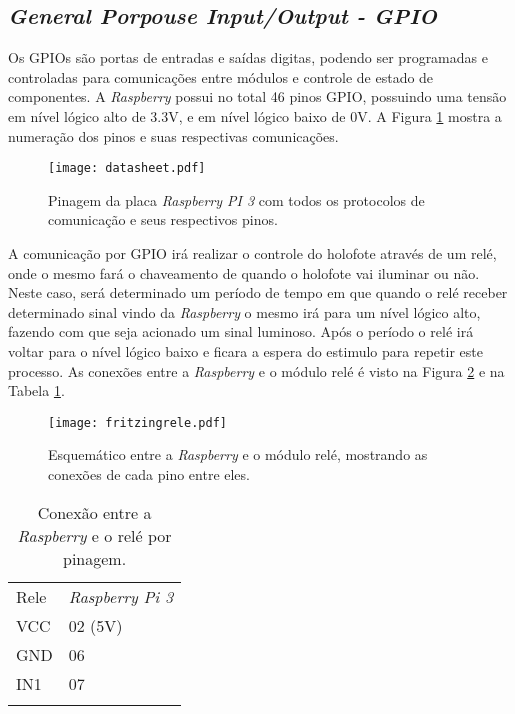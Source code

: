     


\subsection{\emph{General Porpouse Input/Output - GPIO}}

Os GPIOs são portas de entradas e saídas digitas, podendo ser programadas e controladas para comunicações entre módulos e controle de estado de componentes. A \emph{Raspberry} possui no total 46 pinos GPIO, possuindo uma tensão em nível lógico alto de 3.3V, e em nível lógico baixo de 0V. A Figura \ref{datasheet} mostra a numeração dos pinos e suas respectivas comunicações.

\begin{figure}[H]
    \centering
    \texttt{[image: datasheet.pdf]}
    \caption {Pinagem da placa \emph{Raspberry PI 3} com todos os protocolos de comunicação e seus respectivos pinos.}
    \label{datasheet}
\end{figure}


A comunicação por GPIO irá realizar o controle do holofote através de um relé, onde o mesmo fará o chaveamento de quando o holofote vai iluminar ou não. Neste caso, será determinado um período de tempo em que quando o relé receber determinado sinal vindo da \emph{Raspberry} o mesmo irá para um nível lógico alto, fazendo com que seja acionado um sinal luminoso. Após o período o relé irá voltar para o nível lógico baixo e ficara a espera do estimulo para repetir este processo.  As conexões entre a \emph{Raspberry} e o módulo relé é visto na Figura \ref{fritizingrele} e na Tabela \ref{tabelarele}.

    \begin{figure}[H]
    \centering
    \texttt{[image: fritzingrele.pdf]}
    \caption{Esquemático entre a \emph{Raspberry} e o módulo relé, mostrando as conexões de cada pino entre eles.}
    \label{fritizingrele}
\end{figure}

  \begin{table}[h]
 \centering
 {\renewcommand\arraystretch{1.25}
 \caption{Conexão entre a \emph{Raspberry} e o relé por pinagem.}
 \begin{tabular}{ l l }
  \cline{1-1}\cline{2-2}  
    \multicolumn{1}{|p{3.850cm}|}{Rele \centering } &
    \multicolumn{1}{p{4.217cm}|}{\emph{Raspberry Pi 3} \centering }
  \\  
  \cline{1-1}\cline{2-2}  
    \multicolumn{1}{|p{3.850cm}|}{VCC \centering } &
    \multicolumn{1}{p{4.217cm}|}{02 (5V) \centering }
  \\  
  \cline{1-1}\cline{2-2}  
    \multicolumn{1}{|p{3.850cm}|}{GND \centering } &
    \multicolumn{1}{p{4.217cm}|}{06  \centering }
  \\  
  \cline{1-1}\cline{2-2}  
    \multicolumn{1}{|p{3.850cm}|}{IN1 \centering } &
    \multicolumn{1}{p{4.217cm}|}{07 \centering }
  \\  
   \hline
\label{tabelarele}
 \end{tabular} }
\end{table}  


